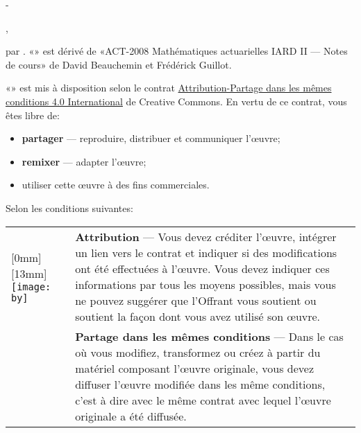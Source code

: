 
\begingroup
\calccentering{\unitlength}
\begin{adjustwidth*}{\unitlength}{-\unitlength}
  \setlength{\parindent}{0pt}
  \setlength{\parskip}{\baselineskip}
  \small

  \raisebox{-2.5mm}{%
    \texttt{[image: by-sa]}} %
  {\theauthor}, {\year}

  {\textcopyright} {\year} par {\theauthor}. «\thetitle» est dérivé de
  «ACT-2008 Mathématiques actuarielles IARD II --- Notes de cours» de
  David Beauchemin et Frédérick Guillot.

  «\thetitle» est mis à disposition selon le contrat
  \href{http://creativecommons.org/licenses/by-sa/4.0/deed.fr}{%
    Attri\-bu\-tion-Partage dans les mêmes conditions 4.0 International}
  de Creative Commons. En vertu de ce contrat, vous êtes libre de:
  \begin{itemize}
  \item \textbf{partager} --- reproduire, distribuer et communiquer
    l'œuvre;
  \item \textbf{remixer} --- adapter l'œuvre;
  \item utiliser cette œuvre à des fins commerciales.
  \end{itemize}
  Selon les conditions suivantes:

  \begin{tabularx}{\linewidth}{@{}lX@{}}
    \raisebox{-9mm}[0mm][13mm]{%
      \texttt{[image: by]}} &
    \textbf{Attribution} --- Vous devez créditer l'œuvre, intégrer
    un lien vers le contrat et indiquer si des modifications ont été
    effectuées à l'œuvre. Vous devez indiquer ces informations par
    tous les moyens possibles, mais vous ne pouvez suggérer que
    l'Offrant vous soutient ou soutient la façon dont vous avez utilisé
    son œuvre. \\
    \raisebox{-9mm}{\texttt{[image: sa]}}
    & \textbf{Partage dans les mêmes conditions} --- Dans le cas où vous
    modifiez, transformez ou créez à partir du matériel composant
    l'œuvre originale, vous devez diffuser l'œuvre modifiée dans
    les même conditions, c'est à dire avec le même contrat avec lequel
    l'œuvre originale a été diffusée.
  \end{tabularx}


\end{adjustwidth*}
